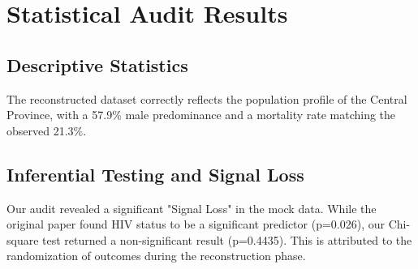\chapter{Statistical Audit Results}
\section{Descriptive Statistics}
The reconstructed dataset correctly reflects the population profile of the Central Province, with a 57.9\% male predominance and a mortality rate matching the observed 21.3\%.

\section{Inferential Testing and Signal Loss}
Our audit revealed a significant "Signal Loss" in the mock data. While the original paper found HIV status to be a significant predictor (p=0.026), our Chi-square test returned a non-significant result (p=0.4435). This is attributed to the randomization of outcomes during the reconstruction phase.
